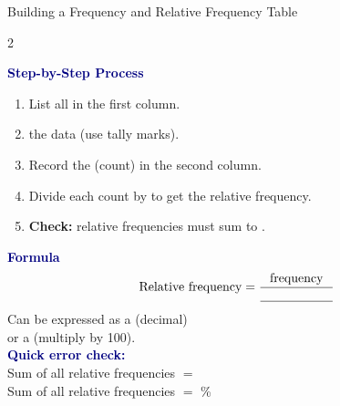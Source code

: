 \documentclass[10pt]{article}
\begin{document}
\vspace{0.1in}

\begin{notesbox}{Building a Frequency and Relative Frequency Table}
\small
\begin{multicols}{2}

\textbf{\textcolor{navy}{Step-by-Step Process}}\\[4pt]
\begin{enumerate}[leftmargin=1.4em, itemsep=3pt]
  \item List all \blank{2.5cm} in the first column.
  \item \blank{2.5cm} the data (use tally marks).
  \item Record the \blank{2cm} (count) in the second column.
  \item Divide each count by \blank{1.5cm} to get the relative frequency.
  \item \textbf{Check:} relative frequencies must sum to \blank{1cm}.
\end{enumerate}

\columnbreak

\textbf{\textcolor{navy}{Formula}}\\[4pt]
\[
  \text{Relative frequency} = \frac{\text{frequency}}{\blank{2cm}}
\]
\vspace{4pt}
Can be expressed as a \blank{2cm} (decimal)\\
or a \blank{2cm} (multiply by 100).\\[8pt]
\textbf{\textcolor{navy}{Quick error check:}}\\
Sum of all relative frequencies $= $ \blank{1cm}\\
Sum of all relative frequencies $= $ \blank{1.5cm}\%

\end{multicols}
\end{notesbox}

\vspace{0.1in}
\end{document}
